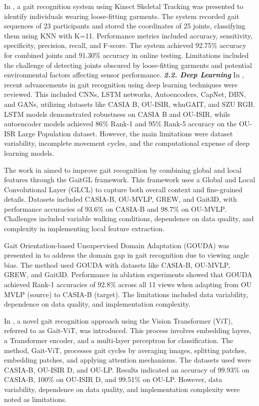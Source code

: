 \documentclass[a4paper]{article}
\begin{document}
In \cite{9}, a gait recognition system using Kinect Skeletal Tracking was presented to identify individuals wearing loose-fitting garments. The system recorded gait sequences of 23 participants and stored the coordinates of 25 joints, classifying them using KNN with K=11. Performance metrics included accuracy, sensitivity, specificity, precision, recall, and F-score. The system achieved 92.75\% accuracy for combined joints and 91.30\% accuracy in online testing. Limitations included the challenge of detecting joints obscured by loose-fitting garments and potential environmental factors affecting sensor performance.\newline\newline
\textit{\normalsize{\textbf{2.2. Deep Learning}}}\newline
In \cite{10}, recent advancements in gait recognition using deep learning techniques were reviewed. This included CNNs, LSTM networks, Autoencoders, CapNet, DBN, and GANs, utilizing datasets like CASIA B, OU-ISIR, whuGAIT, and SZU RGB. LSTM models demonstrated robustness on CASIA B and OU-ISIR, while autoencoder models achieved 86\% Rank-1 and 95\% Rank-5 accuracy on the OU-ISR Large Population dataset. However, the main limitations were dataset variability, incomplete movement cycles, and the computational expense of deep learning models.

The work in \cite{11} aimed to improve gait recognition by combining global and local features through the GaitGL framework. This framework uses a Global and Local Convolutional Layer (GLCL) to capture both overall context and fine-grained details. Datasets included CASIA-B, OU-MVLP, GREW, and Gait3D, with performance accuracies of 93.6\% on CASIA-B and 98.7\% on OU-MVLP. Challenges included variable walking conditions, dependence on data quality, and complexity in implementing local feature extraction.

Gait Orientation-based Unsupervised Domain Adaptation (GOUDA) was presented in \cite{12} to address the domain gap in gait recognition due to viewing angle bias. The method used GOUDA with datasets like CASIA-B, OU-MVLP, GREW, and Gait3D. Performance in ablation experiments showed that GOUDA achieved Rank-1 accuracies of 92.8\% across all 11 views when adapting from OU MVLP (source) to CASIA-B (target). The limitations included data variability, dependence on data quality, and implementation complexity.

In \cite{13}, a novel gait recognition approach using the Vision Transformer (ViT), referred to as Gait-ViT, was introduced. This process involves embedding layers, a Transformer encoder, and a multi-layer perceptron for classification. The method, Gait-ViT, processes gait cycles by averaging images, splitting patches, embedding patches, and applying attention mechanisms. The datasets used were CASIA-B, OU-ISIR D, and OU-LP. Results indicated an accuracy of 99.93\% on CASIA-B, 100\% on OU-ISIR D, and 99.51\% on OU-LP. However, data variability, dependence on data quality, and implementation complexity were noted as limitations.
\end{document}
